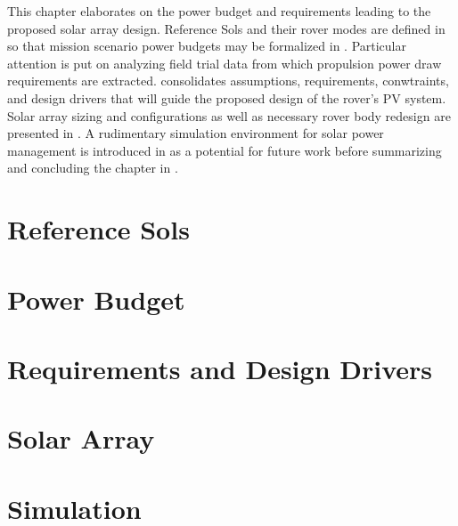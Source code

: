 This chapter elaborates on the power budget and requirements leading to the proposed solar array design. Reference Sols and their rover modes are defined in  so that mission scenario power budgets may be formalized in . Particular attention is put on analyzing field trial data from which propulsion power draw requirements are extracted.  consolidates assumptions, requirements, conwtraints, and design drivers that will guide the proposed design of the rover's \ac{PV} system. Solar array sizing and configurations as well as necessary rover body redesign are presented in . A rudimentary simulation environment for solar power management is introduced in  as a potential for future work before summarizing and concluding the chapter in .

\section{Reference Sols}
\label{sec:Design:ReferenceSols}


\section{Power Budget}
\label{sec:Design:PowerBudget}


\section{Requirements and Design Drivers}
\label{sec:Design:RequirementsAndDesignDrivers}



\section{Solar Array}
\label{sec:Design:SolarArray}


\section{Simulation}
\label{sec:Design:Simulation}



